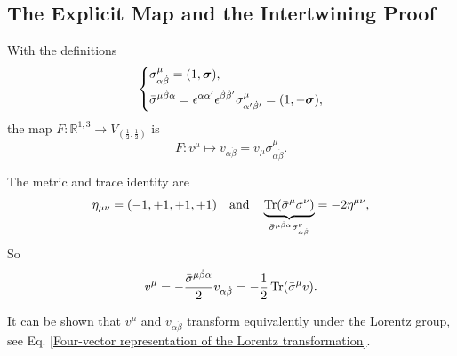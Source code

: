 \subsection{The Explicit Map and the Intertwining Proof}
With the definitions
\begin{equation}
    \begin{dcases}
        \sigma^\mu_{\alpha \dot\beta} = (1, \boldsymbol{\sigma}), \\
        \bar\sigma^{\mu \dot\beta \alpha} = \epsilon^{\alpha \alpha'} \epsilon^{\dot\beta \dot\beta'} \sigma^\mu_{\alpha' \dot\beta'} = (1, - \boldsymbol{\sigma}),
    \end{dcases}
\end{equation}
the map $F:\mathbb R^{1, 3} \to V_{(\frac{1}{2}, \frac{1}{2})}$ is
\begin{equation}
    F: v^\mu \mapsto v_{\alpha \dot\beta} = v_\mu \sigma^\mu_{\alpha \dot\beta}.
\end{equation}
\begin{framed}
    The metric and trace identity are
    \begin{equation}
        \eta_{\mu \nu} = (- 1, + 1, + 1, + 1) \quad \text{and} \quad \underbrace{\operatorname{Tr}(\bar\sigma^\mu \sigma^\nu)}_{ \bar\sigma^{\mu \dot\beta \alpha} \sigma^\nu_{\alpha \dot\beta}} = - 2 \eta^{\mu \nu},
    \end{equation}
    So
    \begin{equation}
        v^\mu = - \frac{\bar\sigma^{\mu \dot\beta \alpha}}{2} v_{\alpha \dot\beta} = - \frac{1}{2} \operatorname{Tr}(\bar\sigma^\mu v).
    \end{equation}
\end{framed}
It can be shown that $v^\mu$ and $v_{\alpha \dot\beta}$ transform equivalently under the Lorentz group, see Eq. \eqref{Four-vector representation of the Lorentz transformation}.
